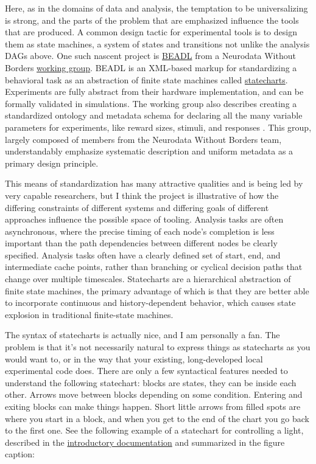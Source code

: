 \documentclass[10pt]{article}
\begin{document}
\begin{multicols}{2}
Here, as in the domains of data and analysis, the temptation to be
universalizing is strong, and the parts of the problem that are
emphasized influence the tools that are produced. A common design tactic
for experimental tools is to design them as state machines, a system of
states and transitions not unlike the analysis DAGs above. One such
nascent project is
\href{https://archive.org/details/beadl-xml-documentation-v-0.1/mode/2up}{BEADL}
\cite{wulfBEADLXMLDocumentation2020}  from a Neurodata Without
Borders
\href{https://archive.org/details/nwb-behavioral-task-wg}{working
group}. BEADL is an XML-based markup for standardizing a behavioral task
as an abstraction of finite state machines called
\href{https://statecharts.github.io/}{statecharts}. Experiments are
fully abstract from their hardware implementation, and can be formally
validated in simulations. The working group also describes creating a
standardized ontology and metadata schema for declaring all the many
variable parameters for experiments, like reward sizes, stimuli, and
responses \cite{nwbbehavioraltaskwgNWBBehavioralTask2020} . This
group, largely composed of members from the Neurodata Without Borders
team, understandably emphasize systematic description and uniform
metadata as a primary design principle.

This means of standardization has many attractive qualities and is being
led by very capable researchers, but I think the project is illustrative
of how the differing constraints of different systems and differing
goals of different approaches influence the possible space of tooling.
Analysis tasks are often asynchronous, where the precise timing of each
node's completion is less important than the path dependencies between
different nodes be clearly specified. Analysis tasks often have a
clearly defined set of start, end, and intermediate cache points, rather
than branching or cyclical decision paths that change over multiple
timescales. Statecharts are a hierarchical abstraction of finite state
machines, the primary advantage of which is that they are better able to
incorporate continuous and history-dependent behavior, which causes
state explosion in traditional finite-state machines.

The syntax of statecharts is actually nice, and I am personally a fan.
The problem is that it's not necessarily natural to express things as
statecharts as you would want to, or in the way that your existing,
long-developed local experimental code does. There are only a few
syntactical features needed to understand the following statechart:
blocks are states, they can be inside each other. Arrows move between
blocks depending on some condition. Entering and exiting blocks can make
things happen. Short little arrows from filled spots are where you start
in a block, and when you get to the end of the chart you go back to the
first one. See the following example of a statechart for controlling a
light, described in the
\href{https://statecharts.dev/on-off-statechart.html}{introductory
documentation} and summarized in the figure caption:


\end{multicols}
\end{document}
